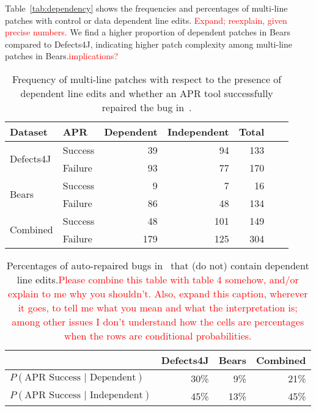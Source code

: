 \documentclass[sigconf, timestamp-false, anonymous=true]{acmart}
\newcommand\todo[1]{\textcolor{red}{#1}}
\begin{document}
Table~\ref{tab:dependency} shows the 
frequencies and percentages of multi-line patches with control or data dependent 
line edits. \todo{Expand; reexplain, given precise numbers.}  We find a higher proportion of dependent patches in Bears compared to 
Defects4J, indicating higher patch complexity among multi-line patches in Bears.\todo{implications?}


\begin{table}
{\begin{center}
	\begin{tabular}{l | l | r r r r | r}
		\toprule
		Dataset & APR & Dependent & Independent & Total \\
		\midrule
		\multirow{2}{*}{Defects4J} & Success & 39 & 94 & 133 \\
		                                          & Failure   & 93 & 77 & 170 \\
		\midrule
		\multirow{2}{*}{Bears}       & Success &   9 &   7 &   16 \\
		                                          & Failure   & 86 & 48 & 134 \\
		\midrule
		\multirow{2}{*}{Combined}& Success & 48 &101& 149 \\
		                                          & Failure   &179&125& 304 \\
\bottomrule
	\end{tabular}
 \end{center}
}
	\caption{Frequency of multi-line patches with respect to the presence of 
	dependent line edits and whether an APR tool successfully 
	repaired the bug in~\cite{durieux-repair-them-all}.}
	\label{tab:dependency-repair-contingency-table}
\end{table}

\begin{table}
{\begin{center}
	\begin{tabular}{l | rrr}
            	\toprule
		& Defects4J & Bears & Combined \\
		\midrule
		$P(\mbox{APR Success } | \mbox{ Dependent})$ & 30\% & 9\% & 21\% \\
		$P(\mbox{APR Success } | \mbox{ Independent})$ & 45\% & 13\% & 45\% \\
		\bottomrule
	\end{tabular}
 \end{center}
}
	\caption{Percentages of auto-repaired bugs in~\cite{durieux-repair-them-all} 
	that (do not) contain dependent line edits.\todo{Please combine this
          table with table 4 somehow, and/or explain to me why you shouldn't.
          Also, expand this caption, wherever it goes, to tell me what you mean
          and what the interpretation is; among other issues I don't understand how the cells are
          percentages when the rows are conditional probabilities.}
	\label{tab:dependency-repair-percents}}
\end{table}
\end{document}
